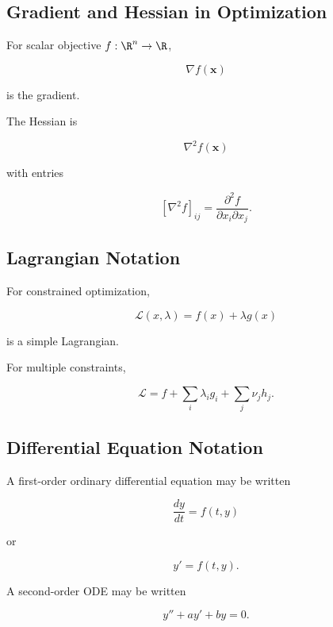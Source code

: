 \subsection{Gradient and Hessian in Optimization}
\label{subsec:optimization-gradient-hessian-reference}

For scalar objective \(f:\R^n\to\R\),

\[
\boxed{
\nabla f(\mathbf{x})
}
\]

is the gradient.

The Hessian is

\[
\boxed{
\nabla^2f(\mathbf{x})
}
\]

with entries

\[
\boxed{
\left[
\nabla^2f
\right]_{ij}
=
\frac{\partial^2f}
{\partial x_i\partial x_j}.
}
\]

\subsection{Lagrangian Notation}
\label{subsec:lagrangian-notation-reference}

For constrained optimization,

\[
\boxed{
\mathcal{L}(x,\lambda)
=
f(x)
+
\lambda g(x)
}
\]

is a simple Lagrangian.

For multiple constraints,

\[
\boxed{
\mathcal{L}
=
f
+
\sum_i\lambda_i g_i
+
\sum_j\nu_j h_j.
}
\]

\subsection{Differential Equation Notation}
\label{subsec:differential-equation-symbols-reference}

A first-order ordinary differential equation may be written

\[
\boxed{
\frac{dy}{dt}
=
f(t,y)
}
\]

or

\[
\boxed{
y'=f(t,y).
}
\]

A second-order ODE may be written

\[
\boxed{
y''+ay'+by=0.
}
\]

